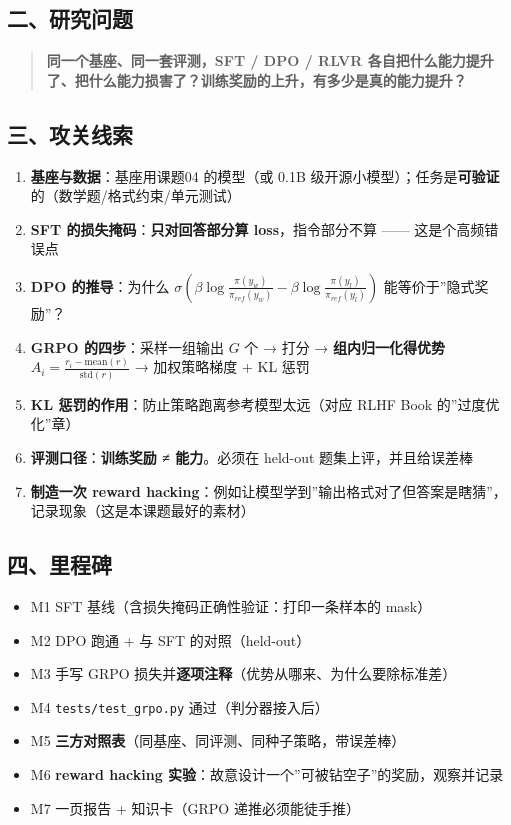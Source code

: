 \documentclass[
  chinese,
  11pt,
]{ctexart}
\providecommand{\tightlist}{%
  \setlength{\itemsep}{0pt}\setlength{\parskip}{0pt}}
\begin{document}
\subsection{二、研究问题}\label{ux4e8cux7814ux7a76ux95eeux9898-2}

\begin{quote}
\textbf{同一个基座、同一套评测，SFT / DPO / RLVR 各自把什么能力提升了、把什么能力损害了？训练奖励的上升，有多少是真的能力提升？}
\end{quote}

\subsection{三、攻关线索}\label{ux4e09ux653bux5173ux7ebfux7d22-6}

\begin{enumerate}
\def\labelenumi{\arabic{enumi}.}
\tightlist
\item
  \textbf{基座与数据}：基座用课题04 的模型（或 0.1B 级开源小模型）；任务是\textbf{可验证}的（数学题/格式约束/单元测试）
\item
  \textbf{SFT 的损失掩码}：\textbf{只对回答部分算 loss}，指令部分不算 ------ 这是个高频错误点
\item
  \textbf{DPO 的推导}：为什么 \(\sigma(\beta \log\frac{\pi(y_w)}{\pi_{ref}(y_w)} - \beta\log\frac{\pi(y_l)}{\pi_{ref}(y_l)})\) 能等价于''隐式奖励''？
\item
  \textbf{GRPO 的四步}：采样一组输出 \(G\) 个 → 打分 → \textbf{组内归一化得优势} \(A_i = \frac{r_i - \mathrm{mean}(r)}{\mathrm{std}(r)}\) → 加权策略梯度 + KL 惩罚
\item
  \textbf{KL 惩罚的作用}：防止策略跑离参考模型太远（对应 RLHF Book 的''过度优化''章）
\item
  \textbf{评测口径}：\textbf{训练奖励 ≠ 能力}。必须在 held-out 题集上评，并且给误差棒
\item
  \textbf{制造一次 reward hacking}：例如让模型学到''输出格式对了但答案是瞎猜''，记录现象（这是本课题最好的素材）
\end{enumerate}

\subsection{四、里程碑}\label{ux56dbux91ccux7a0bux7891-6}

\begin{itemize}
\tightlist
\item[$\square$]
  M1 SFT 基线（含损失掩码正确性验证：打印一条样本的 mask）
\item[$\square$]
  M2 DPO 跑通 + 与 SFT 的对照（held-out）
\item[$\square$]
  M3 手写 GRPO 损失并\textbf{逐项注释}（优势从哪来、为什么要除标准差）
\item[$\square$]
  M4 \texttt{tests/test\_grpo.py} 通过（判分器接入后）
\item[$\square$]
  M5 \textbf{三方对照表}（同基座、同评测、同种子策略，带误差棒）
\item[$\square$]
  M6 \textbf{reward hacking 实验}：故意设计一个''可被钻空子''的奖励，观察并记录
\item[$\square$]
  M7 一页报告 + 知识卡（GRPO 递推必须能徒手推）
\end{itemize}
\end{document}
